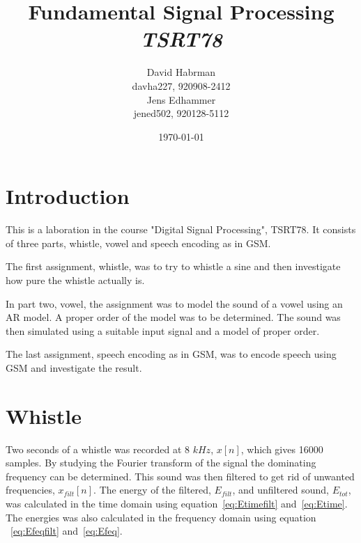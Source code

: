 \documentclass[10pt]{article}
\title{Fundamental Signal Processing\\
\emph{TSRT78}}
\author{David Habrman \\ davha227, 920908-2412\\
Jens Edhammer \\ jened502, 920128-5112 }
\date{\today}
\begin{document}


\maketitle

\newpage
\tableofcontents
\newpage

\section{Introduction}
This is a laboration in the course "Digital Signal Processing", TSRT78.
It consists of three parts, whistle, vowel and speech encoding as in GSM.

The first assignment, whistle, was to try to whistle a sine and then
investigate how pure the whistle actually is.

In part two, vowel, the assignment was to model the sound of a vowel
using an AR model. A proper order of the model was to be determined.
The sound was then simulated using a suitable input signal and a
model of proper order.

The last assignment, speech encoding as in GSM, was to encode speech
using GSM and investigate the result.

\section{Whistle}
Two seconds of a whistle was recorded at 8 $kHz$, $x[n]$, which gives 16000 samples.
By studying the Fourier transform of the signal the dominating frequency can be
determined.
This sound was then filtered to get rid of unwanted frequencies, $x_{filt}[n]$.
The energy of the filtered, $E_{filt}$, and unfiltered sound, $E_{tot}$,
was calculated in the time domain using equation~\ref{eq:Etimefilt}
and~\ref{eq:Etime}. The energies was also calculated in the frequency
domain using equation ~\ref{eq:Efeqfilt} and~\ref{eq:Efeq}.
\end{document}

